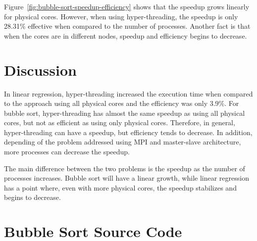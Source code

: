 \documentclass[10pt,twocolumn]{article}
\begin{document}
Figure~\ref{fig:bubble-sort-speedup-efficiency} shows that the speedup grows linearly for physical cores. However, when using hyper-threading, the speedup is only 28.31\% effective when compared to the number of processes. Another fact is that when the cores are in different nodes, speedup and efficiency begins to decrease.

\section*{Discussion}
In linear regression, hyper-threading increased the execution time when compared to the approach using all physical cores and the efficiency was only 3.9\%. For bubble sort, hyper-threading has almost the same speedup as using all physical cores, but not as efficient as using only physical cores. Therefore, in general, hyper-threading can have a speedup, but efficiency tends to decrease. In addition, depending of the problem addressed using MPI and master-slave architecture, more processes can decrease the speedup.

The main difference between the two problems is the speedup as the number of processes increases. Bubble sort will have a linear growth, while linear regression has a point where, even with more physical cores, the speedup stabilizes and begins to decrease.

\onecolumn

\section*{Bubble Sort Source Code}



\end{document}
